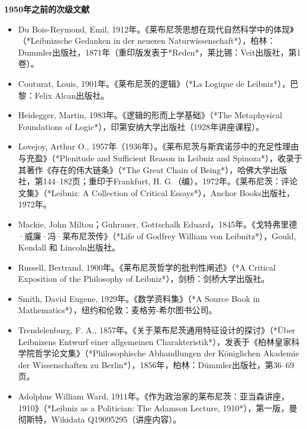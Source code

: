 \textbf{1950年之前的次级文献 } 
\begin{itemize}
\item Du Bois-Reymond, Emil, 1912年。《莱布尼茨思想在现代自然科学中的体现》（*Leibnizsche Gedanken in der neueren Naturwissenschaft*），柏林：Dummler出版社，1871年（重印版发表于*Reden*，莱比锡：Veit出版社，第1卷）。  
\item Couturat, Louis, 1901年。《莱布尼茨的逻辑》（*La Logique de Leibniz*），巴黎：Felix Alcan出版社。  
\item Heidegger, Martin, 1983年。《逻辑的形而上学基础》（*The Metaphysical Foundations of Logic*），印第安纳大学出版社（1928年讲座课程）。  
\item Lovejoy, Arthur O., 1957年（1936年）。《莱布尼茨与斯宾诺莎中的充足性理由与充盈》（*Plenitude and Sufficient Reason in Leibniz and Spinoza*），收录于其著作《存在的伟大链条》（*The Great Chain of Being*），哈佛大学出版社，第144–182页；重印于Frankfurt, H. G.（编），1972年。《莱布尼茨：评论文集》（*Leibniz: A Collection of Critical Essays*），Anchor Books出版社，1972年。  
\item  Mackie, John Milton；Guhrauer, Gottschalk Eduard，1845年。《戈特弗里德·威廉·冯·莱布尼茨传》（*Life of Godfrey William von Leibnitz*），Gould, Kendall 和 Lincoln出版社。  
\item Russell, Bertrand, 1900年。《莱布尼茨哲学的批判性阐述》（*A Critical Exposition of the Philosophy of Leibniz*），剑桥：剑桥大学出版社。  
\item Smith, David Eugene, 1929年。《数学资料集》（*A Source Book in Mathematics*），纽约和伦敦：麦格劳-希尔图书公司。  
\item Trendelenburg, F. A., 1857年。《关于莱布尼茨通用特征设计的探讨》（*Über Leibnizens Entwurf einer allgemeinen Charakteristik*），发表于《柏林皇家科学院哲学论文集》（*Philosophische Abhandlungen der Königlichen Akademie der Wissenschaften zu Berlin*），1856年，柏林：Dümmler出版社，第36–69页。  
\item Adolphus William Ward, 1911年。《作为政治家的莱布尼茨：亚当森讲座，1910》（*Leibniz as a Politician: The Adamson Lecture, 1910*），第一版，曼彻斯特，Wikidata Q19095295（讲座内容）。  
\end{itemize}
